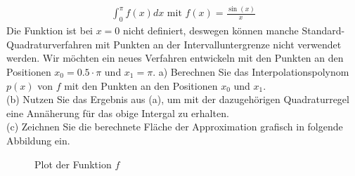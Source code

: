 \documentclass{scrartcl}
\begin{document}
	\begin{align*}
	\int_{0}^{\pi} f(x) dx \text{ mit } f(x) = \frac{\sin(x)}{x}
	\end{align*}
	Die Funktion ist bei $x=0$ nicht definiert, deswegen können manche Standard-Quadraturverfahren mit Punkten an der Intervalluntergrenze nicht verwendet werden. 
	\n 
	Wir möchten ein neues Verfahren entwickeln mit den Punkten an den Positionen $x_0 = 0.5 \cdot \pi$ und $x_1 = \pi$.
	\n 
	a)
	Berechnen Sie das Interpolationspolynom $p(x)$ von $f$ mit den Punkten an den Positionen $x_0$ und $x_1$.
	\lbreak \lbreak \lbreak
	\\
	(b)
	Nutzen Sie das Ergebnis aus (a), um mit der dazugehörigen Quadraturregel eine Annäherung für das obige Intergal zu erhalten.
	\lbreak \lbreak \lbreak
	\\
	(c) 
	Zeichnen Sie die berechnete Fläche der Approximation grafisch in folgende Abbildung ein.
	\begin{figure}[ht]
		\centering
		\caption{Plot der Funktion $f$}
	\end{figure}


\end{document}
